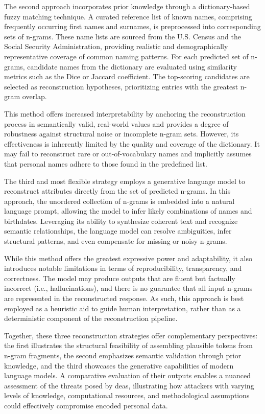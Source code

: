 The second approach incorporates prior knowledge through a dictionary-based fuzzy matching technique.
A curated reference list of known names, comprising frequently occurring first names and surnames, is preprocessed into corresponding sets of n-grams.
These name lists are sourced from the U.S. Census and the Social Security Administration, providing realistic and demographically representative coverage of common naming patterns.
For each predicted set of n-grams, candidate names from the dictionary are evaluated using similarity metrics such as the Dice or Jaccard coefficient.
The top-scoring candidates are selected as reconstruction hypotheses, prioritizing entries with the greatest n-gram overlap.

This method offers increased interpretability by anchoring the reconstruction process in semantically valid, real-world values and provides a degree of robustness against structural noise or incomplete n-gram sets.
However, its effectiveness is inherently limited by the quality and coverage of the dictionary.
It may fail to reconstruct rare or out-of-vocabulary names and implicitly assumes that personal names adhere to those found in the predefined list.

The third and most flexible strategy employs a generative language model to reconstruct attributes directly from the set of predicted n-grams.
In this approach, the unordered collection of n-grams is embedded into a natural language prompt, allowing the model to infer likely combinations of names and birthdates.
Leveraging its ability to synthesize coherent text and recognize semantic relationships, the language model can resolve ambiguities, infer structural patterns, and even compensate for missing or noisy n-grams.

While this method offers the greatest expressive power and adaptability, it also introduces notable limitations in terms of reproducibility, transparency, and correctness.
The model may produce outputs that are fluent but factually incorrect (i.e., hallucinations), and there is no guarantee that all input n-grams are represented in the reconstructed response.
As such, this approach is best employed as a heuristic aid to guide human interpretation, rather than as a deterministic component of the reconstruction pipeline.

Together, these three reconstruction strategies offer complementary perspectives: the first illustrates the structural feasibility of assembling plausible tokens from n-gram fragments, the second emphasizes semantic validation through prior knowledge, and the third showcases the generative capabilities of modern language models.
A comparative evaluation of their outputs enables a nuanced assessment of the threats posed by \ac{dea}s, illustrating how attackers with varying levels of knowledge, computational resources, and methodological assumptions could effectively compromise encoded personal data.

